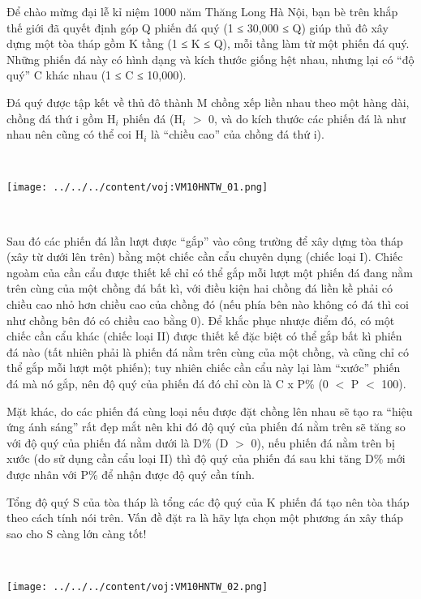 Để chào mừng đại lễ kỉ niệm 1000 năm Thăng Long Hà Nội, bạn bè trên khắp thế giới đã quyết định góp Q phiến đá quý (1 ≤ 30,000 ≤ Q) giúp thủ đô xây dựng một tòa tháp gồm K tầng (1 ≤ K ≤ Q), mỗi tầng làm từ một phiến đá quý. Những phiến đá này có hình dạng và kích thước giống hệt nhau, nhưng lại có “độ quý” C khác nhau (1 ≤ C ≤ 10,000).

Đá quý được tập kết về thủ đô thành M chồng xếp liền nhau theo một hàng dài, chồng đá thứ i gồm H$_i$ phiến đá (H$_i$ $>$ 0, và do kích thước các phiến đá là như nhau nên cũng có thể coi H$_i$ là “chiều cao” của chồng đá thứ i).

 


\texttt{[image: ../../../content/voj:VM10HNTW\_01.png]}

 

Sau đó các phiến đá lần lượt được “gắp” vào công trường để xây dựng tòa tháp (xây từ dưới lên trên) bằng một chiếc cần cẩu chuyên dụng (chiếc loại I). Chiếc ngoàm của cần cẩu được thiết kế chỉ có thể gắp mỗi lượt một phiến đá đang nằm trên cùng của một chồng đá bất kì, với điều kiện hai chồng đá liền kề phải có chiều cao nhỏ hơn chiều cao của chồng đó (nếu phía bên nào không có đá thì coi như chồng bên đó có chiều cao bằng 0). Để khắc phục nhược điểm đó, có một chiếc cần cẩu khác (chiếc loại II) được thiết kế đặc biệt có thể gắp bất kì phiến đá nào (tất nhiên phải là phiến đá nằm trên cùng của một chồng, và cũng chỉ có thể gắp mỗi lượt một phiến); tuy nhiên chiếc cần cẩu này lại làm “xước” phiến đá mà nó gắp, nên độ quý của phiến đá đó chỉ còn là C x P\% (0 $<$ P $<$ 100).

Mặt khác, do các phiến đá cùng loại nếu được đặt chồng lên nhau sẽ tạo ra “hiệu ứng ánh sáng” rất đẹp mắt nên khi đó độ quý của phiến đá nằm trên sẽ tăng so với độ quý của phiến đá nằm dưới là D\% (D $>$ 0), nếu phiến đá nằm trên bị xước (do sử dụng cần cẩu loại II) thì độ quý của phiến đá sau khi tăng D\% mới được nhân với P\% để nhận được độ quý cần tính.

Tổng độ quý S của tòa tháp là tổng các độ quý của K phiến đá tạo nên tòa tháp theo cách tính nói trên. Vấn đề đặt ra là hãy lựa chọn một phương án xây tháp sao cho S càng lớn càng tốt!

 


\texttt{[image: ../../../content/voj:VM10HNTW\_02.png]}